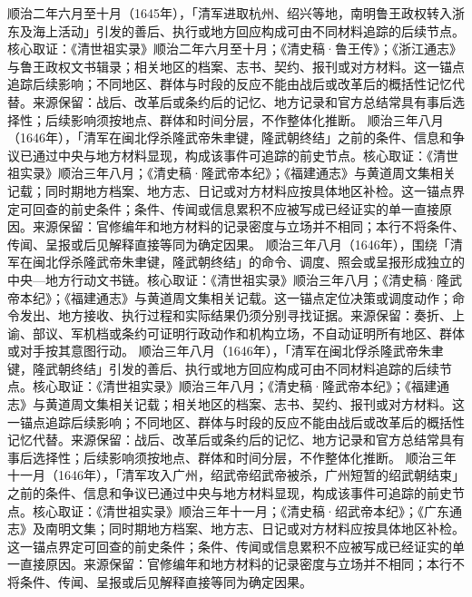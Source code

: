 顺治二年六月至十月（1645年），「清军进取杭州、绍兴等地，南明鲁王政权转入浙东及海上活动」引发的善后、执行或地方回应构成可由不同材料追踪的后续节点。核心取证：《清世祖实录》顺治二年六月至十月；《清史稿·鲁王传》；《浙江通志》与鲁王政权文书辑录；相关地区的档案、志书、契约、报刊或对方材料。这一锚点追踪后续影响；不同地区、群体与时段的反应不能由战后或改革后的概括性记忆代替。来源保留：战后、改革后或条约后的记忆、地方记录和官方总结常具有事后选择性；后续影响须按地点、群体和时间分层，不作整体化推断。
顺治三年八月（1646年），「清军在闽北俘杀隆武帝朱聿键，隆武朝终结」之前的条件、信息和争议已通过中央与地方材料显现，构成该事件可追踪的前史节点。核心取证：《清世祖实录》顺治三年八月；《清史稿·隆武帝本纪》；《福建通志》与黄道周文集相关记载；同时期地方档案、地方志、日记或对方材料应按具体地区补检。这一锚点界定可回查的前史条件；条件、传闻或信息累积不应被写成已经证实的单一直接原因。来源保留：官修编年和地方材料的记录密度与立场并不相同；本行不将条件、传闻、呈报或后见解释直接等同为确定因果。
顺治三年八月（1646年），围绕「清军在闽北俘杀隆武帝朱聿键，隆武朝终结」的命令、调度、照会或呈报形成独立的中央—地方行动文书链。核心取证：《清世祖实录》顺治三年八月；《清史稿·隆武帝本纪》；《福建通志》与黄道周文集相关记载。这一锚点定位决策或调度动作；命令发出、地方接收、执行过程和实际结果仍须分别寻找证据。来源保留：奏折、上谕、部议、军机档或条约可证明行政动作和机构立场，不自动证明所有地区、群体或对手按其意图行动。
顺治三年八月（1646年），「清军在闽北俘杀隆武帝朱聿键，隆武朝终结」引发的善后、执行或地方回应构成可由不同材料追踪的后续节点。核心取证：《清世祖实录》顺治三年八月；《清史稿·隆武帝本纪》；《福建通志》与黄道周文集相关记载；相关地区的档案、志书、契约、报刊或对方材料。这一锚点追踪后续影响；不同地区、群体与时段的反应不能由战后或改革后的概括性记忆代替。来源保留：战后、改革后或条约后的记忆、地方记录和官方总结常具有事后选择性；后续影响须按地点、群体和时间分层，不作整体化推断。
顺治三年十一月（1646年），「清军攻入广州，绍武帝绍武帝被杀，广州短暂的绍武朝结束」之前的条件、信息和争议已通过中央与地方材料显现，构成该事件可追踪的前史节点。核心取证：《清世祖实录》顺治三年十一月；《清史稿·绍武帝本纪》；《广东通志》及南明文集；同时期地方档案、地方志、日记或对方材料应按具体地区补检。这一锚点界定可回查的前史条件；条件、传闻或信息累积不应被写成已经证实的单一直接原因。来源保留：官修编年和地方材料的记录密度与立场并不相同；本行不将条件、传闻、呈报或后见解释直接等同为确定因果。
